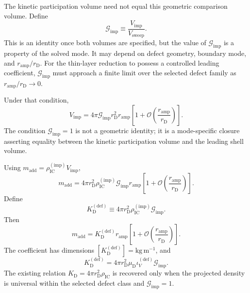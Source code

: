 The kinetic participation volume need not equal this geometric comparison volume. Define
\begin{equation}
    \mathcal G_{\mathrm{imp}}
    \equiv
    \frac{V_{\mathrm{imp}}}{V_{\mathrm{sweep}}}.
\end{equation}
This is an identity once both volumes are specified, but the value of \(\mathcal G_{\mathrm{imp}}\) is a property of the solved mode. It may depend on defect geometry, boundary mode, and \(r_{\mathrm{amp}}/r_{\mathrm D}\). For the thin-layer reduction to possess a controlled leading coefficient, \(\mathcal G_{\mathrm{imp}}\) must approach a finite limit over the selected defect family as \(r_{\mathrm{amp}}/r_{\mathrm D}\rightarrow0\).

Under that condition,
\begin{equation}
    V_{\mathrm{imp}}
    =
    4\pi\mathcal G_{\mathrm{imp}}
    r_{\mathrm D}^2r_{\mathrm{amp}}
    \left[
    1+\mathcal O
    \left(
    \frac{r_{\mathrm{amp}}}{r_{\mathrm D}}
    \right)
    \right].
\end{equation}
The condition \(\mathcal G_{\mathrm{imp}}=1\) is not a geometric identity; it is a mode-specific closure asserting equality between the kinetic participation volume and the leading shell volume.

Using \(m_{\mathrm{add}}=\rho_{\mathrm{IC}}^{(\mathrm{imp})}V_{\mathrm{imp}}\),
\begin{equation}
    m_{\mathrm{add}}
    =
    4\pi r_{\mathrm D}^2
    \rho_{\mathrm{IC}}^{(\mathrm{imp})}
    \mathcal G_{\mathrm{imp}}
    r_{\mathrm{amp}}
    \left[
    1+\mathcal O
    \left(
    \frac{r_{\mathrm{amp}}}{r_{\mathrm D}}
    \right)
    \right].
\end{equation}
Define
\begin{equation}
    \boxed{
    K_{\mathrm D}^{(\mathrm{def})}
    \equiv
    4\pi r_{\mathrm D}^2
    \rho_{\mathrm{IC}}^{(\mathrm{imp})}
    \mathcal G_{\mathrm{imp}} }.
\end{equation}
Then
\begin{equation}
    \boxed{
    m_{\mathrm{add}}
    =
    K_{\mathrm D}^{(\mathrm{def})}r_{\mathrm{amp}}
    \left[
    1+\mathcal O
    \left(
    \frac{r_{\mathrm{amp}}}{r_{\mathrm D}}
    \right)
    \right] }.
\end{equation}
The coefficient has dimensions \([K_{\mathrm D}^{(\mathrm{def})}]=\mathrm{kg\,m^{-1}}\), and
\begin{equation}
    K_{\mathrm D}^{(\mathrm{def})}
    =
    4\pi r_{\mathrm D}^2
    \mu_{\mathrm D}
    \iota_V^{(\mathrm{def})}
    \mathcal G_{\mathrm{imp}}.
\end{equation}
The existing relation \(K_{\mathrm D}=4\pi r_{\mathrm D}^2\rho_{\mathrm{IC}}\) is recovered only when the projected density is universal within the selected defect class and \(\mathcal G_{\mathrm{imp}}=1\).

